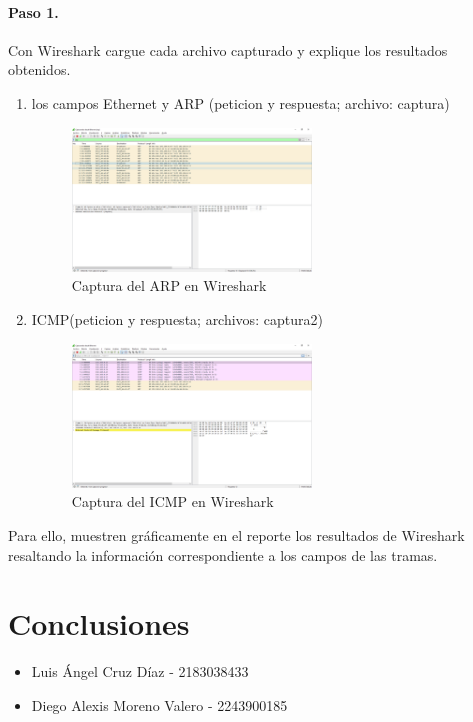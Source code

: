         \paragraph{Paso 1.}
        Con Wireshark cargue cada archivo capturado y explique los resultados obtenidos.
        \begin{enumerate}
            \item los campos Ethernet y ARP (peticion y respuesta; archivo: captura)
            \begin{figure}[H]
                \centering
                \includegraphics[width=0.6\textwidth]{img/ARP.PNG}
                \caption{Captura del ARP en Wireshark}
                \label{fig:ARP}
            \end{figure}
            \item ICMP(peticion y respuesta; archivos: captura2)
            \begin{figure}[H]
                \centering
                \includegraphics[width=0.6\textwidth]{img/ICMP.PNG}
                \caption{Captura del ICMP en Wireshark}
                \label{fig:ICMP}
            \end{figure}
        \end{enumerate}
        Para ello, muestren gráficamente en el reporte los resultados de Wireshark resaltando la información correspondiente a los campos de las tramas.
    
    \section{Conclusiones}

    \begin{itemize}
        \item Luis Ángel Cruz Díaz - 2183038433 \\
        
        \item Diego Alexis Moreno Valero - 2243900185 \\
        
    \end{itemize}
    
